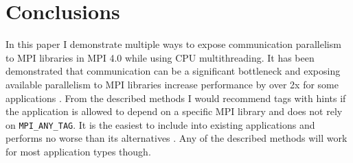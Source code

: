 \documentclass[sigconf]{acmart}
\begin{document}
\section{Conclusions}

In this paper I demonstrate multiple ways to expose communication parallelism to MPI libraries in MPI 4.0 while using CPU multithreading.
It has been demonstrated that communication can be a significant bottleneck and exposing available parallelism to MPI libraries increase performance by over 2x for some applications \cite{zambreLogicalParallel2021}.
From the described methods I would recommend tags with hints if the application is allowed to depend on a specific MPI library and does not rely on \verb|MPI_ANY_TAG|.
It is the easiest to include into existing applications and performs no worse than its alternatives \cite{zambreLessonsLearned2022}.
Any of the described methods will work for most application types though.




\end{document}
